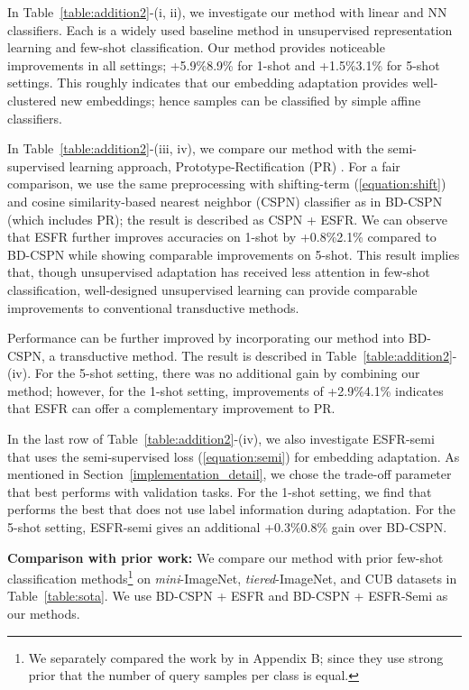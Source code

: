 \documentclass{article}
\begin{document}
In Table~\ref{table:addition2}-(i, ii), we investigate our method with linear and NN classifiers. Each is a widely used baseline method in unsupervised representation learning and few-shot classification. Our method provides noticeable improvements in all settings;  +5.9\%8.9\% for 1-shot and +1.5\%3.1\% for 5-shot settings. This roughly indicates that our embedding adaptation provides well-clustered new embeddings; hence samples can be classified by simple affine classifiers.

In Table~\ref{table:addition2}-(iii, iv), we compare our method with the semi-supervised learning approach, Prototype-Rectification (PR) \cite{BDCSPN}. For a fair comparison, we use the same preprocessing with shifting-term (\ref{equation:shift}) and cosine similarity-based nearest neighbor (CSPN) classifier as in BD-CSPN (which includes PR); the result is described as CSPN + ESFR. We can observe that ESFR further improves accuracies on 1-shot by +0.8\%2.1\% compared to BD-CSPN while showing comparable improvements on 5-shot. This result implies that, though unsupervised adaptation has received less attention in few-shot classification, well-designed unsupervised learning can provide comparable improvements to conventional transductive methods.

Performance can be further improved by incorporating our method into BD-CSPN, a transductive method. The result is described in Table~\ref{table:addition2}-(iv). For the 5-shot setting, there was no additional gain by combining our method; however, for the 1-shot setting, improvements of +2.9\%4.1\% indicates that ESFR can offer a complementary improvement to PR.

In the last row of Table~\ref{table:addition2}-(iv), we also investigate ESFR-semi that uses the semi-supervised loss  (\ref{equation:semi}) for embedding adaptation. As mentioned in Section~\ref{implementation_detail}, we chose the trade-off parameter  that best performs with validation tasks. For the 1-shot setting, we find that  performs the best that does not use label information during adaptation. For the 5-shot setting, ESFR-semi gives an additional +0.3\%0.8\% gain over BD-CSPN.

\textbf{Comparison with prior work:}
We compare our method with prior few-shot classification methods\footnote{We separately compared the work by \cite{TIM} in Appendix B; since they use strong prior that the number of query samples per class is equal.} on \textit{mini}-ImageNet, \textit{tiered}-ImageNet, and CUB datasets in Table~\ref{table:sota}. We use BD-CSPN + ESFR and BD-CSPN + ESFR-Semi as our methods.
\end{document}
